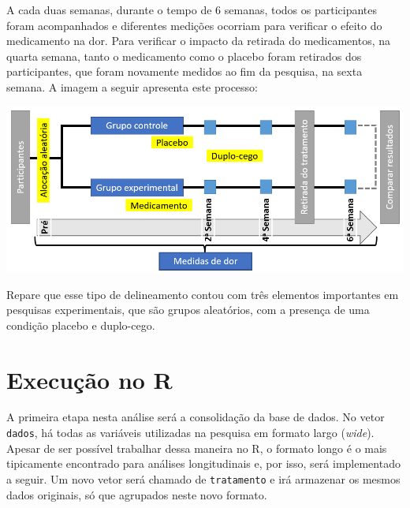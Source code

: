 \documentclass[
]{book}
\begin{document}
A cada duas semanas, durante o tempo de 6 semanas, todos os participantes foram acompanhados e diferentes medições ocorriam para verificar o efeito do medicamento na dor. Para verificar o impacto da retirada do medicamentos, na quarta semana, tanto o medicamento como o placebo foram retirados dos participantes, que foram novamente medidos ao fim da pesquisa, na sexta semana. A imagem a seguir apresenta este processo:

\includegraphics{./img/delineamento_experimental.png}

Repare que esse tipo de delineamento contou com três elementos importantes em pesquisas experimentais, que são grupos aleatórios, com a presença de uma condição placebo e duplo-cego.

\hypertarget{execuuxe7uxe3o-no-r-11}{%
\section{Execução no R}\label{execuuxe7uxe3o-no-r-11}}

A primeira etapa nesta análise será a consolidação da base de dados. No vetor \texttt{dados}, há todas as variáveis utilizadas na pesquisa em formato largo (\emph{wide}). Apesar de ser possível trabalhar dessa maneira no R, o formato longo é o mais tipicamente encontrado para análises longitudinais e, por isso, será implementado a seguir. Um novo vetor será chamado de \texttt{tratamento} e irá armazenar os mesmos dados originais, só que agrupados neste novo formato.
\end{document}
